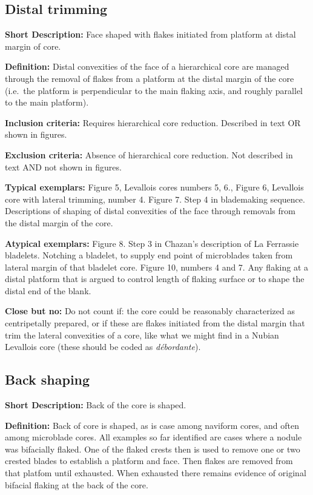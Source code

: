 \documentclass[
]{article}
\begin{document}
\hypertarget{distal-trimming}{%
\subsection{Distal trimming}\label{distal-trimming}}

\textbf{Short Description:} Face shaped with flakes initiated from
platform at distal margin of core.

\textbf{Definition:} Distal convexities of the face of a hierarchical
core are managed through the removal of flakes from a platform at the
distal margin of the core (i.e.~the platform is perpendicular to the
main flaking axis, and roughly parallel to the main platform).

\textbf{Inclusion criteria:} Requires hierarchical core reduction.
Described in text OR shown in figures.

\textbf{Exclusion criteria:} Absence of hierarchical core reduction. Not
described in text AND not shown in figures.

\textbf{Typical exemplars:} Figure 5, Levallois cores numbers 5, 6.,
Figure 6, Levallois core with lateral trimming, number 4. Figure 7. Step
4 in blademaking sequence. Descriptions of shaping of distal convexities
of the face through removals from the distal margin of the core.

\textbf{Atypical exemplars:} Figure 8. Step 3 in Chazan's description of
La Ferrassie bladelets. Notching a bladelet, to supply end point of
microblades taken from lateral margin of that bladelet core. Figure 10,
numbers 4 and 7. Any flaking at a distal platform that is argued to
control length of flaking surface or to shape the distal end of the
blank.

\textbf{Close but no:} Do not count if: the core could be reasonably
characterized as centripetally prepared, or if these are flakes
initiated from the distal margin that trim the lateral convexities of a
core, like what we might find in a Nubian Levallois core (these should
be coded as \emph{débordante}).

\hypertarget{back-shaping}{%
\subsection{Back shaping}\label{back-shaping}}

\textbf{Short Description:} Back of the core is shaped.

\textbf{Definition:} Back of core is shaped, as is case among naviform
cores, and often among microblade cores. All examples so far identified
are cases where a nodule was bifacially flaked. One of the flaked crests
then is used to remove one or two crested blades to establish a platform
and face. Then flakes are removed from that platfom until exhausted.
When exhausted there remains evidence of original bifacial flaking at
the back of the core.
\end{document}
